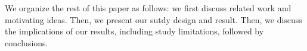 
We organize the rest of this paper as follows: we first discuss related work and motivating ideas. Then, we present our sutdy design and result. Then, we discuss the implications of our results, including study limitations, followed by conclusions.
